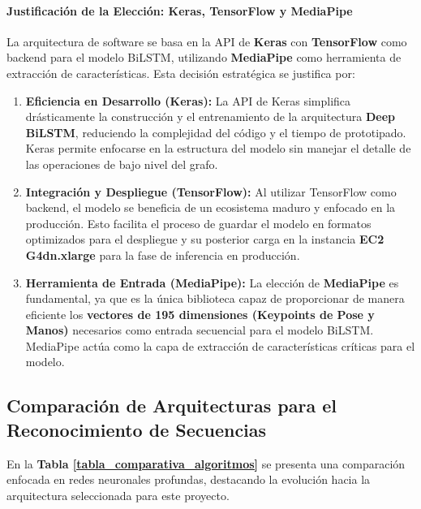 \paragraph{Justificación de la Elección: Keras, TensorFlow y MediaPipe}
La arquitectura de software se basa en la API de \textbf{Keras} con \textbf{TensorFlow} como backend para el modelo BiLSTM, utilizando \textbf{MediaPipe} como herramienta de extracción de características. Esta decisión estratégica se justifica por:

\begin{enumerate}[label=\arabic*., nosep, itemsep=0pt]
    \item \textbf{Eficiencia en Desarrollo (Keras):} La API de Keras simplifica drásticamente la construcción y el entrenamiento de la arquitectura \textbf{Deep BiLSTM}, reduciendo la complejidad del código y el tiempo de prototipado. Keras permite enfocarse en la estructura del modelo sin manejar el detalle de las operaciones de bajo nivel del grafo.
    \item \textbf{Integración y Despliegue (TensorFlow):} Al utilizar TensorFlow como backend, el modelo se beneficia de un ecosistema maduro y enfocado en la producción. Esto facilita el proceso de guardar el modelo en formatos optimizados para el despliegue y su posterior carga en la instancia \textbf{EC2 G4dn.xlarge} para la fase de inferencia en producción.
    \item \textbf{Herramienta de Entrada (MediaPipe):} La elección de \textbf{MediaPipe} es fundamental, ya que es la única biblioteca capaz de proporcionar de manera eficiente los \textbf{vectores de 195 dimensiones (Keypoints de Pose y Manos)} necesarios como entrada secuencial para el modelo BiLSTM. MediaPipe actúa como la capa de extracción de características críticas para el modelo.
\end{enumerate}
\clearpage

\subsection{Comparación de Arquitecturas para el Reconocimiento de Secuencias}

En la \textbf{Tabla \ref{tabla_comparativa_algoritmos}} se presenta una comparación enfocada en redes neuronales profundas, destacando la evolución hacia la arquitectura seleccionada para este proyecto.


